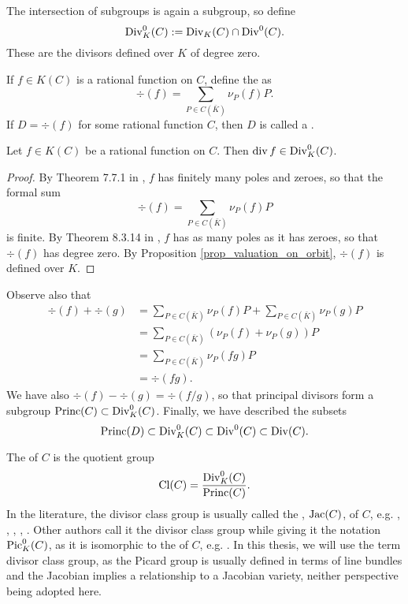 The intersection of subgroups is again a subgroup, so define
  \[ \operatorname{Div}_K^0(C) := \operatorname{Div}_K(C) \cap \operatorname{Div}^0(C). \]
These are the divisors defined over $K$ of degree zero.

If $f \in K(C)$ is a rational function on $C$,
define the  as
\[ \div(f) = \sum_{P \in C(\bar K)} \nu_P(f) P. \]
If $D = \div(f)$ for some rational function $C$,
then $D$ is called a .
\begin{proposition}
  Let $f \in K(C)$ be a rational function on $C$.
  Then $\operatorname{div} f \in \operatorname{Div}_K^0(C)$.
\end{proposition}
\begin{proof}
  By Theorem 7.7.1 in \cite{galbraith12}, $f$ has finitely many poles and zeroes, so that the formal sum
  \[ \div(f) = \sum_{P \in C(\bar K)} \nu_P(f) P \]
  is finite.
  By Theorem 8.3.14 in \cite{galbraith12}, $f$ has as many poles as it has zeroes, so that $\div(f)$ has degree zero.
  By Proposition \ref{prop_valuation_on_orbit}, $\div(f)$ is defined over $K$.
\end{proof}
Observe also that
\begin{align*}
  \div(f) + \div(g)
    &= \sum_{P \in C(\bar K)} \nu_P(f) P + \sum_{P \in C(\bar K)} \nu_P(g) P \\
    &= \sum_{P \in C(\bar K)} (\nu_P(f) + \nu_P(g))P \\
    &= \sum_{P \in C(\bar K)} \nu_P(fg)P \\
    &= \div(fg).
\end{align*}
We have also $\div(f) - \div(g) = \div(f/g)$,
so that principal divisors form a subgroup $\operatorname{Princ}(C) \subset \operatorname{Div}_K^0(C)$.
Finally, we have described the subsets
\[ \operatorname{Princ}(D) \subset \operatorname{Div}_K^0(C) \subset \operatorname{Div}^0(C) \subset \operatorname{Div}(C). \]

The  of $C$ is the quotient group
\[ \operatorname{Cl}(C) = \frac {\operatorname{Div}_K^0(C)} {\operatorname{Princ}(C)}. \]
In the literature, the divisor class group is usually called the , $\operatorname{Jac}(C)$, of $C$,
e.g. \cite{arita05-2}, \cite{basiri04}, \cite{flon08}, \cite{harasawa00}, \cite{salem07}.
Other authors call it the divisor class group while giving it the notation $\operatorname{Pic}_K^0(C)$,
as it is isomorphic to the  of $C$,
e.g. \cite{eisenbud95} \cite{galbraith12} \cite{sutherland16}.
In this thesis, we will use the term divisor class group,
as the Picard group is usually defined in terms of line bundles
and the Jacobian implies a relationship to a Jacobian variety,
neither perspective being adopted here.


